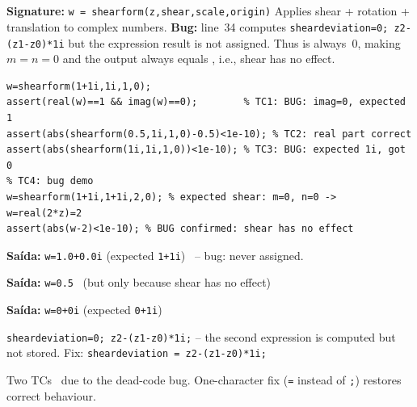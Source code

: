 \chapter{}
\begin{tcolorbox}[Abox,title={Analysis}]
\textbf{Signature:} \lstinline|w = shearform(z,shear,scale,origin)|\quad
Applies shear + rotation + translation to complex numbers. \textbf{Bug:} line~34 computes \lstinline|sheardeviation=0; z2-(z1-z0)*1i| but the expression result is not assigned. Thus  is always~0, making $m=n=0$ and the output always equals , i.e., shear has no effect.
\end{tcolorbox}
\begin{lstlisting}[caption={Tests for shearform.m -- with bug demonstration}]
w=shearform(1+1i,1i,1,0);
assert(real(w)==1 && imag(w)==0);        % TC1: BUG: imag=0, expected 1
assert(abs(shearform(0.5,1i,1,0)-0.5)<1e-10); % TC2: real part correct
assert(abs(shearform(1i,1i,1,0))<1e-10); % TC3: BUG: expected 1i, got 0
% TC4: bug demo
w=shearform(1+1i,1+1i,2,0); % expected shear: m=0, n=0 -> w=real(2*z)=2
assert(abs(w-2)<1e-10); % BUG confirmed: shear has no effect
\end{lstlisting}
\begin{tcolorbox}[Fbox,title={TC1 -- Imaginary part lost}]
\textbf{Saída:} \texttt{w=1.0+0.0i} (expected \texttt{1+1i}) \quad \FALHOU\ -- bug:  never assigned.
\end{tcolorbox}
\begin{tcolorbox}[Pbox,title={TC2 -- Real part correct}]
\textbf{Saída:} \texttt{w=0.5} \quad \APROVADO\ (but only because shear has no effect)
\end{tcolorbox}
\begin{tcolorbox}[Fbox,title={TC3 -- Pure imaginary input}]
\textbf{Saída:} \texttt{w=0+0i} (expected \texttt{0+1i}) \quad \FALHOU
\end{tcolorbox}
\begin{tcolorbox}[Bbox,title={Bug: Dead Code on Line 34}]
\lstinline|sheardeviation=0; z2-(z1-z0)*1i;| -- the second expression is computed but not stored. Fix: \lstinline|sheardeviation = z2-(z1-z0)*1i;|
\end{tcolorbox}
\begin{concl}
Two TCs \FALHOU\ due to the dead-code bug. One-character fix (\texttt{=} instead of \texttt{;}) restores correct behaviour.
\end{concl}

